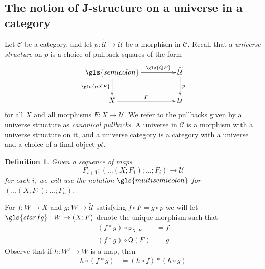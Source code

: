 \documentclass[12pt]{article}
\numberwithin{equation}{section}
\newtheorem{definition}[proposition]{Definition}
\newcommand{\sr}{\rightarrow}
\newcommand{\wt}{\widetilde}
\newcommand{\C}{{\mathcal C}}  %
\newcommand{\p}{\mathsf{p}}
\newcommand{\U}{\mathcal{U}}
\newcommand{\Q}{\mathsf{Q}}
\begin{document}
\subsection{The notion of J-structure on a universe in a category}
%
Let $\C$ be a category,
and let $p:\wt{\U}\sr \U$ be a morphism in
$\C$. Recall \cite{Cfromauniverse} that a {\em universe structure} on $p$ is a choice of pullback
squares of the form
\[
\begin{xy}
          \xymatrix@C=4pc{ \gls{semicolon} \ar[r]^-{\gls{QF}} \ar[d]_{\gls{pXF}} & \wt{\U}
            \ar[d]^{p}\\ X \ar[r]^{F} & \U }
\end{xy}
\label{univstrdiag}
\]
for all $X$ and all morphisms $F:X\sr \U$.
We refer to the pullbacks given by a universe structure as \emph{canonical pullbacks}.
A universe in $\C$ is a
morphism with a universe structure on it, and a universe category is a category
with a universe and a choice of a final object $pt$.

\begin{definition}\label{iter-univ-str}
  Given a sequence of maps $$F_{i+1} : (\dots(X;F_1);\dots;F_i) \to \U$$ for each $i$,
  we will use the notation $\gls{multisemicolon}$ for $(\dots(X;F_1);\dots;F_n)$.
\end{definition}

For $f:W\sr X$ and $g:W\sr \wt{\U}$ satisfying $f\circ F = g \circ p$ we will let $\gls{starfg} : W \sr (X;F)$ denote the unique morphism
such that
%
\begin{align}
  (f*g)\circ \p_{X,F} & =f \label{star-eq1} \\
  (f*g)\circ \Q(F) & =g \label{star-eq2}
\end{align}
Observe that if $h : W' \to W$ is a map, then
\begin{align}
  \label{star-functoriality}
  h \circ ( f * g ) & = (h \circ f) * (h \circ g)
\end{align}
\end{document}

